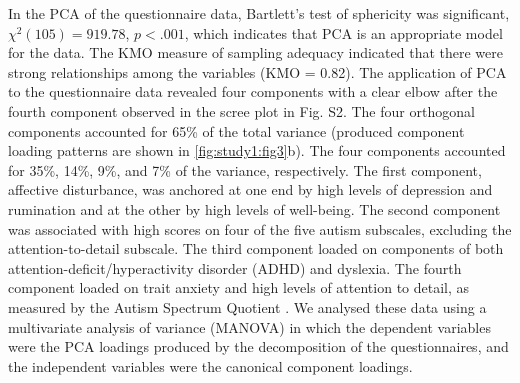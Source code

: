 In the PCA of the questionnaire data, Bartlett’s test of sphericity was significant,
\(\chi^{2}(105) = 919.78\),
\(\mathit{p} < .001\),
which indicates that PCA is an appropriate model for the data. The KMO measure of sampling adequacy indicated that there were strong relationships among the variables (KMO = 0.82). The application of PCA to the questionnaire data revealed four components with a clear elbow after the fourth component observed in the scree plot in Fig. S2. The four orthogonal components accounted for 65\% of the total variance (produced component loading patterns are shown in \cref{fig:study1:fig3}b). The four components accounted for 35\%, 14\%, 9\%, and 7\% of the variance, respectively. The first component, affective disturbance, was anchored at one end by high levels of depression and rumination and at the other by high levels of well-being. The second component was associated with high scores on four of the five autism subscales, excluding the attention-to-detail subscale. The third component loaded on components of both attention-deficit/hyperactivity disorder (ADHD) and dyslexia. The fourth component loaded on trait anxiety and high levels of attention to detail, as measured by the Autism Spectrum Quotient \cite{Baron-Cohen2001}. We analysed these data using a multivariate analysis of variance (MANOVA) in which the dependent variables were the PCA loadings produced by the decomposition of the questionnaires, and the independent variables were the canonical component loadings.
